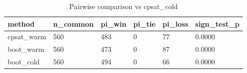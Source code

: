 \begin{table}[t]
\centering
\begin{tabular}{llllll}
\toprule
method & n\_common & pi\_win & pi\_tie & pi\_loss & sign\_test\_p \\
\midrule
cpsat\_warm & 560 & 483 & 0 & 77 & 0.0000 \\
boot\_warm & 560 & 473 & 0 & 87 & 0.0000 \\
boot\_cold & 560 & 494 & 0 & 66 & 0.0000 \\
\bottomrule
\end{tabular}
\caption{Pairwise comparison vs cpsat_cold}
\label{tab:ablation}
\end{table}
